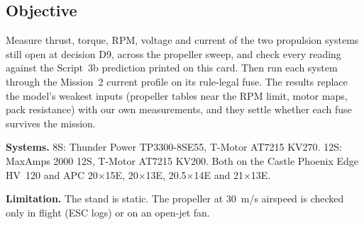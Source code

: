 \documentclass[final]{dbfdoc}
\begin{document}
\begin{frontmatter}
\section{Objective}
\noindent\begin{minipage}[t]{0.62\textwidth}
\setlength\parindent{1.15em}\noindent
Measure thrust, torque, RPM, voltage and current of the two propulsion systems still open at decision D9, across the propeller sweep, and check every reading against the Script~3b prediction printed on this card. Then run each system through the Mission~2 current profile on its rule-legal fuse. The results replace the model's weakest inputs (propeller tables near the RPM limit, motor maps, pack resistance) with our own measurements, and they settle whether each fuse survives the mission.

\noindent\textbf{Systems.} 8S: Thunder Power TP3300-8SE55, T-Motor AT7215 KV270. 12S: MaxAmps 2000 12S, T-Motor AT7215 KV200. Both on the Castle Phoenix Edge HV~120 and APC 20$\times$15E, 20$\times$13E, 20.5$\times$14E and 21$\times$13E.

\noindent\textbf{Limitation.} The stand is static. The propeller at 30~m/s airspeed is checked only in flight (ESC logs) or on an open-jet fan.
\end{minipage}\hfill
\begin{minipage}[t]{0.35\textwidth}
\vspace{-11pt}
\begin{dbfpanel}
\hfill{}\dbfreadoutgap
{}\hfill{}\dbfreadoutgap
{}\hfill{}
\end{dbfpanel}
\end{minipage}
\end{frontmatter}
\end{document}
